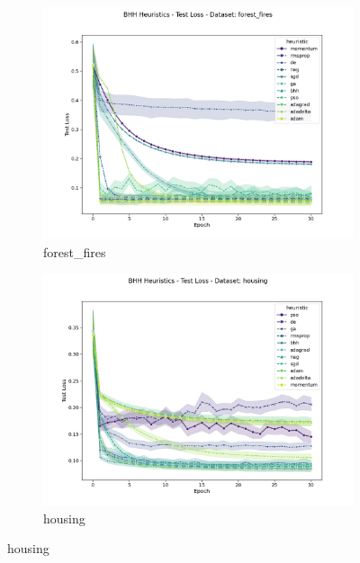 \begin{figure}[htbp]
	\begin{subfigure}{0.48\textwidth}
    	\centering
        \includegraphics[width=\textwidth]{analysis/standalone/figures/test/loss/forest_fires.png}
        \caption{forest\_fires}
        \label{fig:results:standalone:figures:test:loss:forest_fires}
	\end{subfigure}
    \begin{subfigure}{0.48\textwidth}
    	\centering
        \includegraphics[width=\textwidth]{analysis/standalone/figures/test/loss/housing.png}
        \caption{housing}
        \label{fig:results:standalone:figures:test:loss:housing}
	\end{subfigure}

\end{figure}
